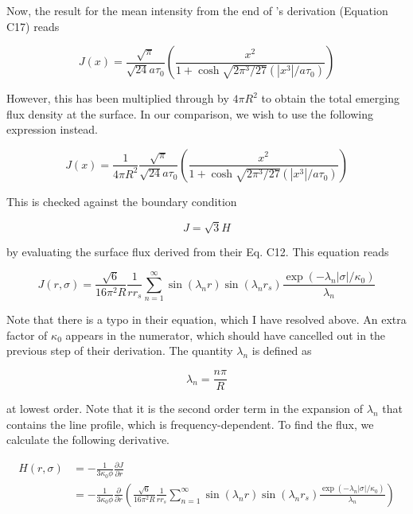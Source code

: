 \documentclass[onecolumn]{aastex63}
\begin{document}
Now, the result for the mean intensity from the end of \cite{2006ApJ...649...14D}'s derivation (Equation C17) reads

\begin{equation} \label{dijkstra}
    J(x) = \frac{\sqrt{\pi}}{\sqrt{24}a\tau_0}\left(\frac{x^2}{1 + \cosh{\sqrt{2\pi^3/27}(|x^3|/a\tau_0)}}\right)
\end{equation}

However, this has been multiplied through by $4\pi R^2$ to obtain the total emerging flux density at the surface. In our comparison, we wish to use the following expression instead.

\begin{equation} \label{c17/4piR^2}
    J(x) = \frac{1}{4\pi R^2}\frac{\sqrt{\pi}}{\sqrt{24}a\tau_0}\left(\frac{x^2}{1 + \cosh{\sqrt{2\pi^3/27}(|x^3|/a\tau_0)}}\right)
\end{equation}

This is checked against the boundary condition

\begin{equation} \label{bc}
    J = \sqrt{3} H
\end{equation}

by evaluating the surface flux derived from their Eq. C12. This equation reads 

\begin{equation} \label{c12}
    J(r, \sigma) = \frac{\sqrt{6}}{16 \pi^2 R} \frac{1}{rr_s} \sum_{n=1}^{\infty}\sin(\lambda_n r) \sin(\lambda_n r_s) \frac{\exp{(-\lambda_n |\sigma|/\kappa_0)}}{\lambda_n}
\end{equation}

Note that there is a typo in their equation, which I have resolved above. An extra factor of $\kappa_0$ appears in the numerator, which should have cancelled out in the previous step of their derivation. The quantity $\lambda_n$ is defined as 

\begin{equation} \label{lambdan}
    \lambda_n = \frac{n\pi}{R}
\end{equation}

at lowest order. Note that it is the second order term in the expansion of $\lambda_n$ that contains the line profile, which is frequency-dependent. To find the flux, we calculate the following derivative.

\begin{equation}
    \begin{split}
    H(r, \sigma) &= - \frac{1}{3\kappa_0 \phi}\frac{\partial J}{\partial r}\\
    &= - \frac{1}{3\kappa_0 \phi}\frac{\partial}{\partial r}\left(\frac{\sqrt{6}}{16 \pi^2 R} \frac{1}{rr_s} \sum_{n=1}^{\infty}\sin(\lambda_n r) \sin(\lambda_n r_s) \frac{\exp{(-\lambda_n |\sigma|/\kappa_0)}}{\lambda_n}\right)
    \end{split}
\end{equation}
\end{document}
